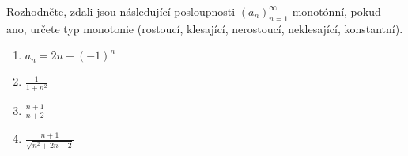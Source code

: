 Rozhodněte, zdali jsou následující posloupnosti $(a_n)_{n = 1}^{\infty}$ monotónní, pokud ano, určete typ monotonie (rostoucí, klesající, nerostoucí, neklesající, konstantní).
\begin{enumerate}
	\item  $a_n = 2n + (-1)^n$
	\item  $\frac{1}{1+n^2}$
	\item  $\frac{n+1}{n+2}$
	\item  $\frac{n+1}{\sqrt{n^2 + 2n - 2}}$
\end{enumerate}


